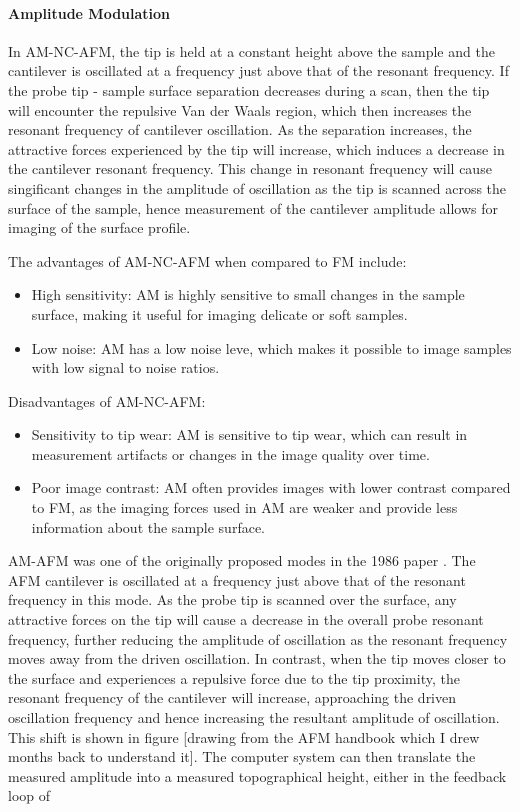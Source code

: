 \paragraph{Amplitude Modulation}
In AM-NC-AFM, the tip is held at a constant height above the sample and the cantilever is oscillated at a frequency just above that of the resonant frequency. If the probe tip - sample surface separation decreases during a scan, then the tip will encounter the repulsive Van der Waals region, which then increases the resonant frequency of cantilever oscillation. As the separation increases, the attractive forces experienced by the tip will increase, which induces a decrease in the cantilever resonant frequency. This change in resonant frequency will cause singificant changes in the amplitude of oscillation as the tip is scanned across the surface of the sample, hence measurement of the cantilever amplitude allows for imaging of the surface profile.

The advantages of AM-NC-AFM when compared to FM include:
\begin{itemize}
    \item High sensitivity: AM is highly sensitive to small changes in the sample surface, making it useful for imaging delicate or soft samples.
    \item Low noise: AM has a low noise leve, which makes it possible to image samples with low signal to noise ratios.
\end{itemize}
Disadvantages of AM-NC-AFM:
\begin{itemize}
    \item Sensitivity to tip wear: AM is sensitive to tip wear, which can result in measurement artifacts or changes in the image quality over time.
    \item Poor image contrast: AM often provides images with lower contrast compared to FM, as the imaging forces used in AM are weaker and provide less information about the sample surface.
\end{itemize}

AM-AFM was one of the originally proposed modes in the 1986 paper \cite{binnig:1986}. The AFM cantilever is oscillated at a frequency just above that of the resonant frequency in this mode. As the probe tip is scanned over the surface, any attractive forces on the tip will cause a decrease in the overall probe resonant frequency, further reducing the amplitude of oscillation as the resonant frequency moves away from the driven oscillation. In contrast, when the tip moves closer to the surface and experiences a repulsive force due to the tip proximity, the resonant frequency of the cantilever will increase, approaching the driven oscillation frequency and hence increasing the resultant amplitude of oscillation. This shift is shown in figure [drawing from the AFM handbook which I drew months back to understand it]. The computer system can then translate the measured amplitude into a measured topographical height, either in the feedback loop of 
